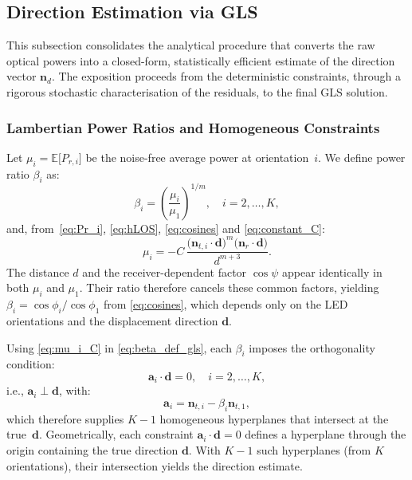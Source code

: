 \documentclass[journal]{IEEEtran}
\newcommand{\added}[1]{{\color{blue}#1}}
\begin{document}
\subsection{Direction Estimation via GLS}
\label{subsec:gls_direction}

This subsection consolidates the analytical procedure that converts the raw optical powers into a closed-form, statistically efficient estimate of the direction vector $\mathbf{n}_d$. The exposition proceeds from the deterministic constraints, through a rigorous stochastic characterisation of the residuals, to the final GLS solution. 

\subsubsection{Lambertian Power Ratios and Homogeneous Constraints}
Let $\mu_i=\mathbb E\!\bigl[P_{r,i}\bigr]$ be the noise-free average power at
orientation~$i$. We define power ratio $\beta_i$ as:
\begin{equation}
  \beta_i=\left(\frac{\mu_i}{\mu_1}\right)^{1/m}, \quad i=2,\ldots,K,
  \label{eq:beta_def_gls}
\end{equation}
and, from~\eqref{eq:Pr_i}, \eqref{eq:hLOS}, \eqref{eq:cosines} and \eqref{eq:constant_C}:
\begin{equation}
\mu_i=-C\,\frac{\bigl(\mathbf{n}_{t,i}\cdot\mathbf{d}\bigr)^{m}
\bigl(\mathbf{n}_r\cdot\mathbf{d}\bigr)}{d^{m+3}}.
\label{eq:mu_i_C}
\end{equation}
\added{The distance $d$ and the receiver-dependent factor $\cos\psi$ appear identically in both $\mu_i$ and $\mu_1$. Their ratio therefore cancels these common factors, yielding $\beta_i = \cos\phi_i / \cos\phi_1$ from \eqref{eq:cosines}, which depends only on the LED orientations and the displacement direction $\mathbf{d}$.}

Using \eqref{eq:mu_i_C} in \eqref{eq:beta_def_gls}, each $\beta_i$ imposes the orthogonality condition:
\begin{equation}
  \mathbf a_i\cdot
  \mathbf d=0,
  \quad
  i=2,\ldots,K,
  \label{eq:homog_gls}
\end{equation}
i.e., $\mathbf a_i \perp \mathbf d$, with:
\begin{equation}
\mathbf a_i\!=\!\mathbf n_{t,i}-\beta_i\mathbf n_{t,1}, 
\label{eq:definition_a_i}
\end{equation}
which therefore supplies $K-1$ homogeneous hyperplanes that intersect at the true~$\mathbf d$.
\added{Geometrically, each constraint $\mathbf{a}_i\cdot\mathbf{d}=0$ defines a hyperplane through the origin containing the true direction $\mathbf{d}$. With $K-1$ such hyperplanes (from $K$ orientations), their intersection yields the direction estimate.}
\end{document}
